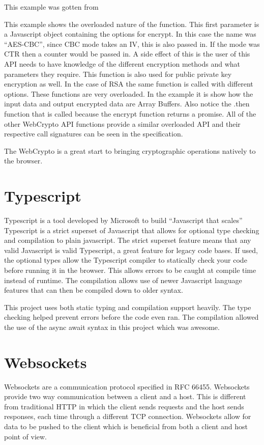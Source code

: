 This example was gotten from \cite{aes-example}


This example shows the overloaded nature of the function. This first parameter is a Javascript object containing the options for encrypt. In this case the name was “AES-CBC”, since CBC mode takes an IV, this is also passed in. If the mode was CTR then a counter would be passed in. A side effect of this is the user of this API needs to have knowledge of the different encryption methods and what parameters they require. This function is also used for public private key encryption as well. In the case of RSA the same function is called with different options. These functions are very overloaded. In the example it is show how the input data and output encrypted data are Array Buffers. Also notice the .then function that is called because the encrypt function returns a promise. All of the other WebCrypto API functions provide a similar overloaded API and their respective call signatures can be seen in the specification.


The WebCrypto is a great start to bringing cryptographic operations natively to the browser.


\section{Typescript}


Typescript is a tool developed by Microsoft to build “Javascript that scales” \cite{typescript}
Typescript is a strict superset of Javascript that allows for optional type checking and compilation to plain javascript. The strict superset feature means that any valid Javascript is valid Typescript, a great feature for legacy code bases. If used, the optional types allow the Typescript compiler to statically check your code before running it in the browser. This allows errors to be caught at compile time instead of runtime. The compilation allows use of newer Javascript language features that can then be compiled down to older syntax. 


This project uses both static typing and compilation support heavily. The type checking helped prevent errors before the code even ran. The compilation allowed the use of the async await syntax in this project which was awesome. 


\section{Websockets}


Websockets are a communication protocol specified in RFC 66455. \cite{websocket-rfc} Websockets provide two way communication between a client and a host. This is different from traditional HTTP in which the client sends requests and the host sends responses, each time through a different TCP connection. Websockets allow for data to be pushed to the client which is beneficial from both a client and host point of view.



